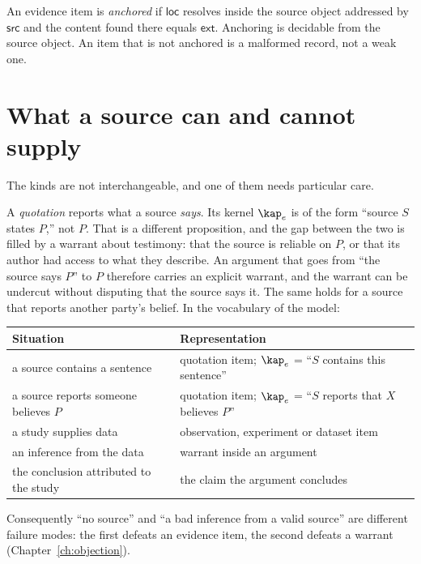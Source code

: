 \begin{definition}[Anchoring]
An evidence item is \emph{anchored} if $\mathsf{loc}$ resolves inside the source object addressed by $\mathsf{src}$ and the content found there equals $\mathsf{ext}$. Anchoring is decidable from the source object. An item that is not anchored is a malformed record, not a weak one.
\end{definition}

\section{What a source can and cannot supply}

The kinds are not interchangeable, and one of them needs particular care.

A \emph{quotation} reports what a source \emph{says}. Its kernel $\kap_e$ is of the form ``source $S$ states $P$,'' not $P$. That is a different proposition, and the gap between the two is filled by a warrant about testimony: that the source is reliable on $P$, or that its author had access to what they describe. An argument that goes from ``the source says $P$'' to $P$ therefore carries an explicit warrant, and the warrant can be undercut without disputing that the source says it. The same holds for a source that reports another party's belief. In the vocabulary of the model:

\begin{center}
\begin{tabularx}{\textwidth}{@{}lX@{}}
\toprule
Situation & Representation\\
\midrule
a source contains a sentence & quotation item; $\kap_e$ = ``$S$ contains this sentence''\\
a source reports someone believes $P$ & quotation item; $\kap_e$ = ``$S$ reports that $X$ believes $P$''\\
a study supplies data & observation, experiment or dataset item\\
an inference from the data & warrant inside an argument\\
the conclusion attributed to the study & the claim the argument concludes\\
\bottomrule
\end{tabularx}
\end{center}

Consequently ``no source'' and ``a bad inference from a valid source'' are different failure modes: the first defeats an evidence item, the second defeats a warrant (Chapter~\ref{ch:objection}).

